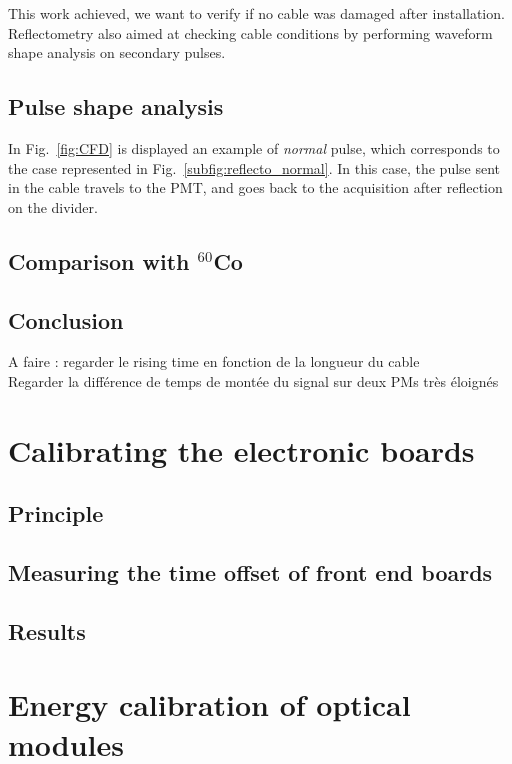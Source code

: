 This work achieved, we want to verify if no cable was damaged after installation.
Reflectometry also aimed at checking cable conditions by performing waveform shape analysis on secondary pulses.

\subsection{Pulse shape analysis}
\label{subsec:pulse_shape}
In Fig.~\ref{fig:CFD} is displayed an example of \emph{normal} pulse, which corresponds to the case represented in Fig.~\ref{subfig:reflecto_normal}.
In this case, the pulse sent in the cable travels to the PMT, and goes back to the acquisition after reflection on the divider.


\subsection{Comparison with $^{60}$Co}

\subsection{Conclusion}
A faire : regarder le rising time en fonction de la longueur du cable\\
Regarder la différence de temps de montée du signal sur deux PMs très éloignés

\section{Calibrating the electronic boards}
\label{sec:TimeSynchroFEB}

\subsection{Principle}
\subsection{Measuring the time offset of front end boards}
\subsection{Results}


\section{Energy calibration of optical modules}
\label{sec:comm_energy_calibration}


